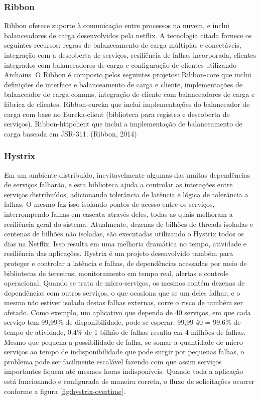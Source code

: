 \documentclass[journal]{IEEEtran}
\begin{document}
\subsubsection{Ribbon}
Ribbon oferece suporte à comunicação entre processos na nuvem, e inclui balanceadores de carga desenvolvidos pela netflix. A tecnologia citada fornece os seguintes recursos: regras de balanceamento de carga múltiplas e conectáveis, integração com a descoberta de serviços, resiliência de falhas incorporada, clientes integrados com balanceadores de carga e configuração de clientes utilizando Archaius. O Ribbon é composto pelos seguintes projetos: Ribbon-core que inclui definições de interface e balanceamento de carga e cliente, implementações de balanceador de carga comuns, integração de cliente com balanceadores de carga e fábrica de clientes. Ribbon-eureka que inclui implementações do balanceador de carga com base no Eureka-client (biblioteca para registro e descoberta de serviços). Ribbon-httpclient que inclui a implementação de balanceamento de carga baseada em JSR-311. (Ribbon, 2014)

\subsubsection{Hystrix}
Em um ambiente distribuído, inevitavelmente algumas das muitas dependências de serviços falharão, e esta biblioteca ajuda a controlar as interações entre serviços distribuídos, adicionando tolerância de latência e lógica de tolerância a falhas. O mesmo faz isso isolando pontos de acesso entre os serviços, interrompendo falhas em cascata através deles, todas as quais melhoram a resiliência geral do sistema. Atualmente, dezenas de bilhões de threads isoladas e centenas de bilhões não isoladas, são executadas utilizando o Hystrix todos os dias na Netflix. Isso resulta em uma melhoria dramática no tempo, atividade e resiliência das aplicações. Hystrix é um projeto desenvolvido também para proteger e controlar a latência e falhas, de dependências acessadas por meio de bibliotecas de terceiros, monitoramento em tempo real, alertas e controle operacional. Quando se trata de micro-serviços, os mesmos contém dezenas de dependências com outros serviços, o que ocasiona que se um deles falhar, e o mesmo não estiver isolado destas falhas externas, corre o risco de também ser afetado. Como exemplo, um aplicativo que dependa de 40 serviços, em que cada serviço tem 99,99\% de disponibilidade, pode se esperar: 99,99 \^ 40 = 99,6\% de tempo de atividade, 0.4\% de 1 bilhão de falhas resulta em 4 milhões de falhas. Mesmo que pequena a possibilidade de falha, se somar a quantidade de micro-serviços ao tempo de indisponibilidade que pode surgir por pequenas falhas, o problema pode ser facilmente escalável fazendo com que assim serviços importantes fiquem até mesmos horas indisponíveis. Quando toda a aplicação está funcionando e configurada de maneira correta, o fluxo de solicitações ocorrer conforme a figura \ref{fig:hystrix-overtime}.
\end{document}
